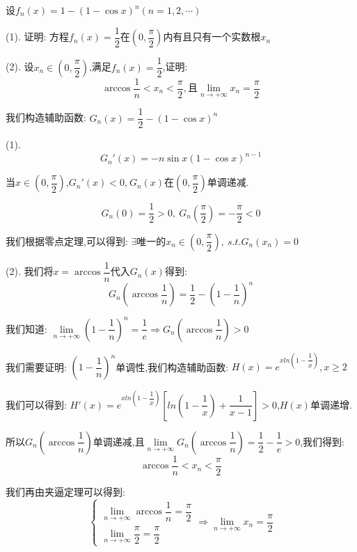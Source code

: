 \begin{proposition}
	设$f_{n}(x)=1-(1-\cos x)^n(n=1,2,\cdots)$

(1). 证明:  方程$f_{n}(x)=\dfrac{1}{2}$在$(0,\dfrac{\pi}{2})$内有且只有一个实数根$x_{n}$

(2). 设$x_{n}\in(0,\dfrac{\pi}{2})$,满足$f_{n}(x)=\dfrac{1}{2}$,证明:  $$\arccos \dfrac{1}{n}<x_{n}<\dfrac{\pi}{2},\text{且}\lim\limits_{n\rightarrow +\infty}x_{n}=\dfrac{\pi}{2}$$
\end{proposition}
\begin{solution}
	
	我们构造辅助函数:  $G_{n}(x)=\dfrac{1}{2}-(1-\cos x)^{n}$
	
	(1). $$G_{n}'(x)=-n\sin x(1-\cos x)^{n-1}$$
	
	当$x\in(0,\dfrac{\pi}{2})$,$G_{n}'(x)<0$,$\ G_{n}(x)$在$(0,\dfrac{\pi}{2})$单调递减.
	
	$$G_{n}(0)=\dfrac{1}{2}>0,\ G_{n}(\dfrac{\pi}{2})=-\dfrac{\pi}{2}<0$$
	
	我们根据零点定理,可以得到:  $\exists \text{唯一的}x_{n}\in(0,\dfrac{\pi}{2}),\ s.t. G_{n}(x_{n})=0$
	
	(2). 我们将$x=\arccos\dfrac{1}{n}$代入$G_{n}(x)$得到:  
	$$G_{n}(\arccos\dfrac{1}{n})=\dfrac{1}{2}-(1-\dfrac{1}{n})^{n}$$
	
	我们知道:  $\lim\limits_{n\rightarrow+\infty}(1-\dfrac{1}{n})^{n}=\dfrac{1}{e}\Rightarrow G_{n}(\arccos\dfrac{1}{n})>0$
	
	我们需要证明:  $(1-\dfrac{1}{n})^n$单调性,我们构造辅助函数:  $H(x)=e^{xln(1-\dfrac{1}{x})},x\geq 2$
	
	我们可以得到:  $H'(x)=e^{xln(1-\dfrac{1}{x})}[ln(1-\dfrac{1}{x})+\dfrac{1}{x-1}]>0$,$H(x)$单调递增.
	
	所以$G_{n}(\arccos\dfrac{1}{n})$单调递减,且$\lim\limits_{n\rightarrow+\infty}G_{n}(\arccos\dfrac{1}{n})=\dfrac{1}{2}-\dfrac{1}{e}>0$,我们得到:  $$\arccos \dfrac{1}{n}<x_{n}<\dfrac{\pi}{2}$$
	
	我们再由夹逼定理可以得到:  
	$$\left\lbrace
	\begin{array}{l}
		\lim\limits_{n\rightarrow  +\infty}\arccos \dfrac{1}{n}=\dfrac{\pi}{2}\\
		\lim\limits_{n\rightarrow  +\infty}\dfrac{\pi}{2}=\dfrac{\pi}{2}
	\end{array}
	\right. \Rightarrow \lim\limits_{n\rightarrow +\infty}x_{n}=\dfrac{\pi}{2}$$
	
\end{solution}


